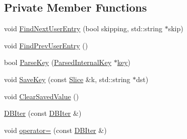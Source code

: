 \subsection*{Private Member Functions}
\begin{DoxyCompactItemize}
\item 
void \hyperlink{classleveldb_1_1anonymous__namespace_02db__iter_8cc_03_1_1_d_b_iter_a9e2646a8b351b7138e76931b520980a1}{Find\+Next\+User\+Entry} (bool skipping, std\+::string $\ast$skip)
\item 
void \hyperlink{classleveldb_1_1anonymous__namespace_02db__iter_8cc_03_1_1_d_b_iter_aaeee72c9de1fd48a427a9172bc6ec02b}{Find\+Prev\+User\+Entry} ()
\item 
bool \hyperlink{classleveldb_1_1anonymous__namespace_02db__iter_8cc_03_1_1_d_b_iter_acbf3dbf6311908fbee425b26a38985bb}{Parse\+Key} (\hyperlink{structleveldb_1_1_parsed_internal_key}{Parsed\+Internal\+Key} $\ast$\hyperlink{classleveldb_1_1anonymous__namespace_02db__iter_8cc_03_1_1_d_b_iter_a3553118d800278eb9ab467c64de063a6}{key})
\item 
void \hyperlink{classleveldb_1_1anonymous__namespace_02db__iter_8cc_03_1_1_d_b_iter_a8d4287979d92635c8bab8ee04c6d88d2}{Save\+Key} (const \hyperlink{classleveldb_1_1_slice}{Slice} \&k, std\+::string $\ast$dst)
\item 
void \hyperlink{classleveldb_1_1anonymous__namespace_02db__iter_8cc_03_1_1_d_b_iter_abd0cb7bbcf8c9952c25e76b452d520d3}{Clear\+Saved\+Value} ()
\item 
\hyperlink{classleveldb_1_1anonymous__namespace_02db__iter_8cc_03_1_1_d_b_iter_aa461f7beaa5242757ad71320bb31a2f7}{D\+B\+Iter} (const \hyperlink{classleveldb_1_1anonymous__namespace_02db__iter_8cc_03_1_1_d_b_iter}{D\+B\+Iter} \&)
\item 
void \hyperlink{classleveldb_1_1anonymous__namespace_02db__iter_8cc_03_1_1_d_b_iter_a2202015b85f31a603f4b00ce2622d761}{operator=} (const \hyperlink{classleveldb_1_1anonymous__namespace_02db__iter_8cc_03_1_1_d_b_iter}{D\+B\+Iter} \&)
\end{DoxyCompactItemize}
